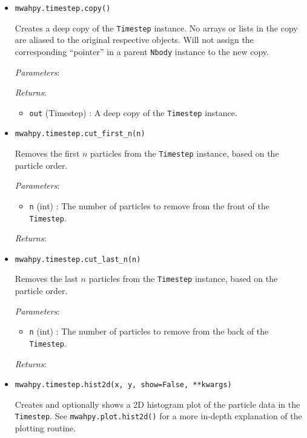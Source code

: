 \documentclass{article}
\begin{document}
\begin{itemize}
\item \verb!mwahpy.timestep.copy()!

Creates a deep copy of the \verb!Timestep! instance. No arrays or lists in the copy are aliased to the original respective objects. Will not assign the corresponding ``pointer'' in a parent \verb!Nbody! instance to the new copy. 

\textit{Parameters}: 

\textit{Returns}: \begin{itemize} 

\item \verb!out! (Timestep) : A deep copy of the \verb!Timestep! instance.

\end{itemize}



\item \verb!mwahpy.timestep.cut_first_n(n)!

Removes the first $n$ particles from the \verb!Timestep! instance, based on the particle order. 

\textit{Parameters}: \begin{itemize}

\item \verb!n! (int) : The number of particles to remove from the front of the \verb!Timestep!.

\end{itemize}

\textit{Returns}: 



\item \verb!mwahpy.timestep.cut_last_n(n)!

Removes the last $n$ particles from the \verb!Timestep! instance, based on the particle order. 

\textit{Parameters}: \begin{itemize}

\item \verb!n! (int) : The number of particles to remove from the back of the \verb!Timestep!.

\end{itemize}

\textit{Returns}: 



\item \verb!mwahpy.timestep.hist2d(x, y, show=False, **kwargs)!

Creates and optionally shows a 2D histogram plot of the particle data in the \verb!Timestep!. See \verb!mwahpy.plot.hist2d()! for a more in-depth explanation of the plotting routine.


\end{itemize}
\end{document}
